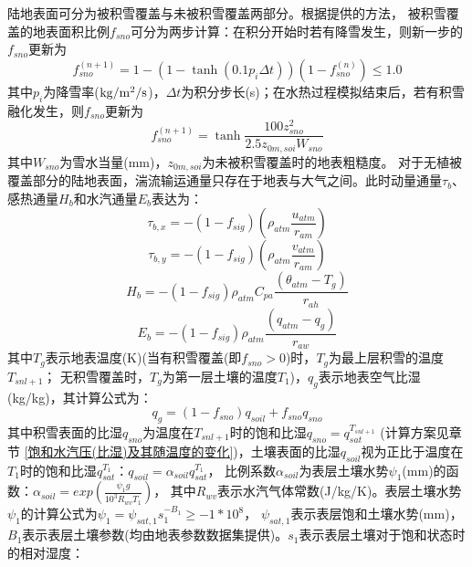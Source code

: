 陆地表面可分为被积雪覆盖与未被积雪覆盖两部分。根据\citet{swenson2012new}提供的方法，
被积雪覆盖的地表面积比例$f_{sno}$可分为两步计算：在积分开始时若有降雪发生，则新一步的$f_{sno}$更新为
\begin{equation}
f_{{sno }}^{(n+1)}=1-\left(1-\tanh \left(0.1 p_{i} \Delta t\right)\right)\left(1-f_{{sno }}^{(n)}\right) \leq 1.0
\end{equation}
其中$p_i$为降雪率($\rm kg/m^2/s$)，$\Delta t$为积分步长(s)；在水热过程模拟结束后，若有积雪融化发生，则$f_{sno}$更新为
\begin{equation}
f_{sno}^{(n+1)}=\tanh \frac{100 z_{s n o}^{2}}{2.5 z_{0 m, s o i} W_{sno}}
\end{equation}
其中$W_{sno}$为雪水当量(mm)，$z_{0m,soi}$为未被积雪覆盖时的地表粗糙度。
对于无植被覆盖部分的陆地表面，湍流输运通量只存在于地表与大气之间。此时动量通量$\tau_b$、感热通量$H_b$和水汽通量$E_b$表达为：
\begin{equation}
\tau_{b, x}=-\left(1-f_{sig}\right)\left(\rho_{atm} \frac{u_{atm}}{r_{a m}}\right)
\end{equation}
\begin{equation}
\tau_{b, y}=-\left(1-f_{sig}\right)\left(\rho_{atm} \frac{v_{atm}}{r_{a m}}\right)
\end{equation}
\begin{equation}
H_{b}=-\left(1-f_{sig}\right) \rho_{atm} C_{p a} \frac{\left(\theta_{atm}-T_{g}\right)}{r_{a h}}
\end{equation}
\begin{equation}
E_{b}=-\left(1-f_{sig}\right) \rho_{atm} \frac{\left(q_{atm}-q_{g}\right)}{r_{a w}}
\end{equation}
其中$T_g$表示地表温度(K)(当有积雪覆盖(即$f_{sno}>0$)时，$T_g$为最上层积雪的温度$T_{snl+1}$；
无积雪覆盖时，$T_g$为第一层土壤的温度$T_1$)，$q_g$表示地表空气比湿(kg/kg)，其计算公式为：
\begin{equation}
q_{g}=\left(1-f_{{sno }}\right) q_{{soil }}+f_{{sno }} q_{{sno }}
\end{equation}
其中积雪表面的比湿$q_{sno}$为温度在$T_{snl+1}$时的饱和比湿$q_{sno}=q_{sat}^{T_{snl+1}}$
(计算方案见章节 \ref{饱和水汽压(比湿)及其随温度的变化})，土壤表面的比湿$q_{soil}$视为正比于温度在$T_1$时的饱和比湿$q_{sat}^{T_1}：q_{soil}=\alpha_{soil}q_{sat}^{T_1}$，
比例系数$\alpha_{soil}$为表层土壤水势$\psi_1$(mm)的函数\citep{philip1957theory}：$\alpha_{soil}=exp\left(\frac{\psi_1g}{{10}^3R_{wv}T_1}\right)$，
其中$R_{wv}$表示水汽气体常数(J/kg/K)。表层土壤水势$\psi_1$的计算公式为$\psi_1=\psi_{sat,1}s_1^{-B_1}\geq-1\ast{10}^8$，
$\psi_{sat,1}$表示表层饱和土壤水势(mm)，$B_1$表示表层土壤\citet{clapp1978empirical}参数(均由地表参数数据集提供)。$s_1$表示表层土壤对于饱和状态时的相对湿度：
